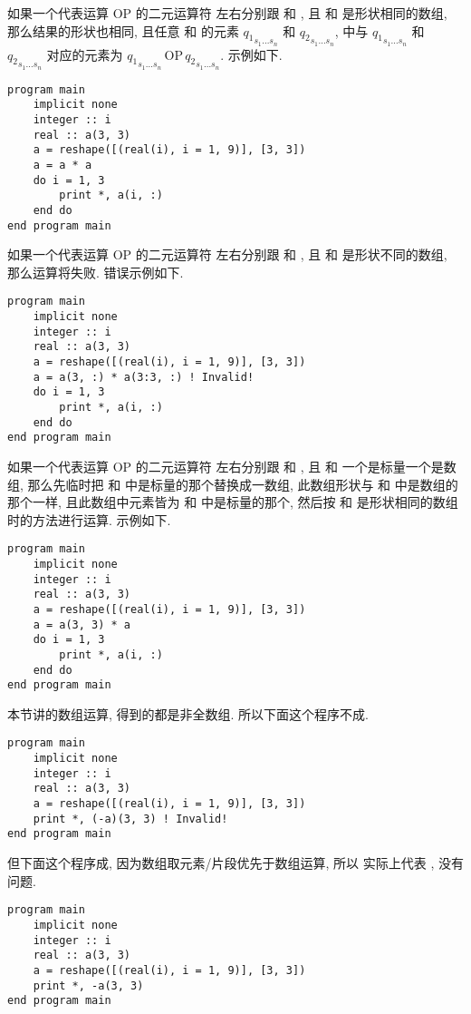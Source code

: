 如果一个代表运算 $\text{OP}$ 的二元运算符  左右分别跟  和 , 且  和  是形状相同的数组, 那么结果的形状也相同, 且任意  和  的元素 ${q_1}_{s_1\dots s_n}$ 和 ${q_2}_{s_1\dots s_n}$,  中与 ${q_1}_{s_1\dots s_n}$ 和 ${q_2}_{s_1\dots s_n}$ 对应的元素为 ${q_1}_{s_1\dots s_n}\,\text{OP}\,{q_2}_{s_1\dots s_n}$. 示例如下.
\begin{lstlisting}
program main
    implicit none
    integer :: i
    real :: a(3, 3)
    a = reshape([(real(i), i = 1, 9)], [3, 3])
    a = a * a
    do i = 1, 3
        print *, a(i, :)
    end do
end program main
\end{lstlisting}
如果一个代表运算 $\text{OP}$ 的二元运算符  左右分别跟  和 , 且  和  是形状不同的数组, 那么运算将失败. 错误示例如下.
\begin{lstlisting}
program main
    implicit none
    integer :: i
    real :: a(3, 3)
    a = reshape([(real(i), i = 1, 9)], [3, 3])
    a = a(3, :) * a(3:3, :) ! Invalid!
    do i = 1, 3
        print *, a(i, :)
    end do
end program main
\end{lstlisting}
如果一个代表运算 $\text{OP}$ 的二元运算符  左右分别跟  和 , 且  和  一个是标量一个是数组, 那么先临时把  和  中是标量的那个替换成一数组, 此数组形状与  和  中是数组的那个一样, 且此数组中元素皆为  和  中是标量的那个, 然后按  和  是形状相同的数组时的方法进行运算. 示例如下.
\begin{lstlisting}
program main
    implicit none
    integer :: i
    real :: a(3, 3)
    a = reshape([(real(i), i = 1, 9)], [3, 3])
    a = a(3, 3) * a
    do i = 1, 3
        print *, a(i, :)
    end do
end program main
\end{lstlisting}

本节讲的数组运算, 得到的都是非全数组. 所以下面这个程序不成.
\begin{lstlisting}
program main
    implicit none
    integer :: i
    real :: a(3, 3)
    a = reshape([(real(i), i = 1, 9)], [3, 3])
    print *, (-a)(3, 3) ! Invalid!
end program main
\end{lstlisting}
但下面这个程序成, 因为数组取元素/片段优先于数组运算, 所以  实际上代表 , 没有问题.
\begin{lstlisting}
program main
    implicit none
    integer :: i
    real :: a(3, 3)
    a = reshape([(real(i), i = 1, 9)], [3, 3])
    print *, -a(3, 3)
end program main
\end{lstlisting}
